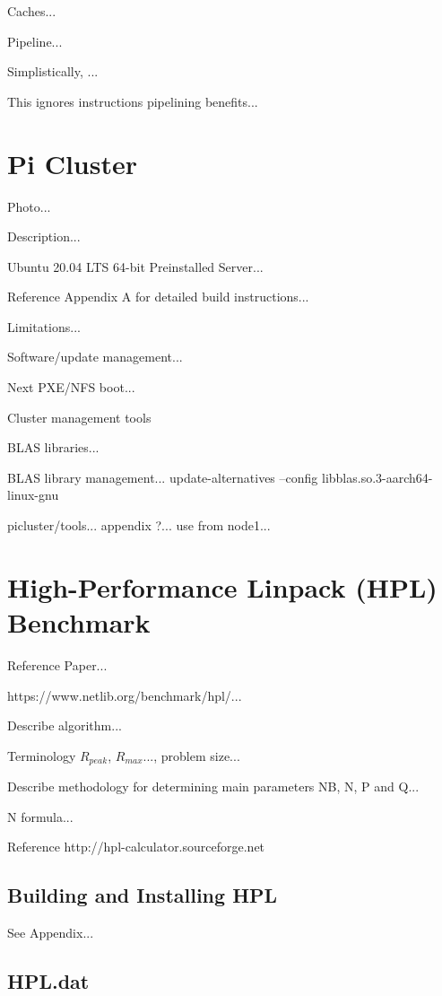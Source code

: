 \documentclass{article}
\begin{document}
Caches...

Pipeline...

Simplistically, ...

This ignores instructions pipelining benefits...



\section{Pi Cluster}

Photo...

Description...

Ubuntu 20.04 LTS 64-bit Preinstalled Server...

Reference Appendix A for detailed build instructions...

Limitations...

Software/update management...

Next PXE/NFS boot...

Cluster management tools

BLAS libraries...

BLAS library management... update-alternatives --config libblas.so.3-aarch64-linux-gnu

picluster/tools... appendix ?... use from node1...



\section{High-Performance Linpack (HPL) Benchmark}

Reference Paper...

https://www.netlib.org/benchmark/hpl/...

Describe algorithm...

Terminology $R_{peak}$, $R_{max}$..., problem size...

Describe methodology for determining main parameters NB, N, P and Q...

N formula...

Reference http://hpl-calculator.sourceforge.net



\subsection{Building and Installing HPL}

See Appendix...



\subsection{HPL.dat}
\end{document}
